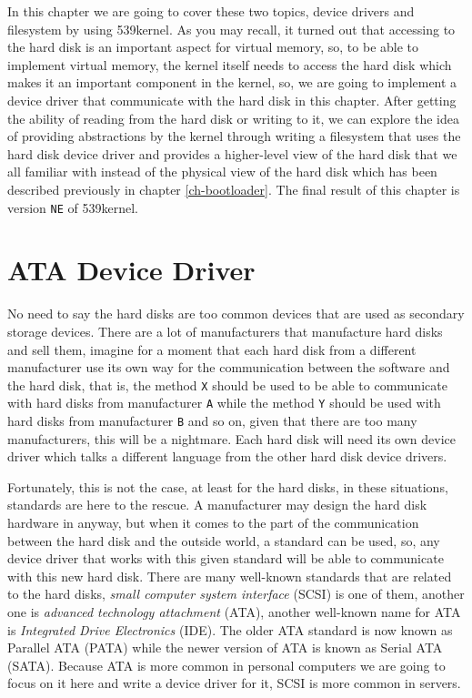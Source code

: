 In this chapter we are going to cover these two topics, device drivers
and filesystem by using 539kernel. As you may recall, it turned out that
accessing to the hard disk is an important aspect for virtual memory,
so, to be able to implement virtual memory, the kernel itself needs to
access the hard disk which makes it an important component in the
kernel, so, we are going to implement a device driver that communicate
with the hard disk in this chapter. After getting the ability of reading
from the hard disk or writing to it, we can explore the idea of
providing abstractions by the kernel through writing a filesystem that
uses the hard disk device driver and provides a higher-level view of the
hard disk that we all familiar with instead of the physical view of the
hard disk which has been described previously in chapter
\ref{ch-bootloader}. The final result of this chapter is version
\lstinline!NE! of 539kernel.

\section{ATA Device Driver}\label{ata-device-driver}

No need to say the hard disks are too common devices that are used as
secondary storage devices. There are a lot of manufacturers that
manufacture hard disks and sell them, imagine for a moment that each
hard disk from a different manufacturer use its own way for the
communication between the software and the hard disk, that is, the
method \lstinline!X! should be used to be able to communicate with hard
disks from manufacturer \lstinline!A! while the method \lstinline!Y!
should be used with hard disks from manufacturer \lstinline!B! and so
on, given that there are too many manufacturers, this will be a
nightmare. Each hard disk will need its own device driver which talks a
different language from the other hard disk device drivers.

Fortunately, this is not the case, at least for the hard disks, in these
situations, standards are here to the rescue. A manufacturer may design
the hard disk hardware in anyway, but when it comes to the part of the
communication between the hard disk and the outside world, a standard
can be used, so, any device driver that works with this given standard
will be able to communicate with this new hard disk. There are many
well-known standards that are related to the hard disks, \emph{small
computer system interface} (SCSI) is one of them, another one is
\emph{advanced technology attachment} (ATA), another well-known name for
ATA is \emph{Integrated Drive Electronics} (IDE). The older ATA standard
is now known as Parallel ATA (PATA) while the newer version of ATA is
known as Serial ATA (SATA). Because ATA is more common in personal
computers we are going to focus on it here and write a device driver for
it, SCSI is more common in servers.

